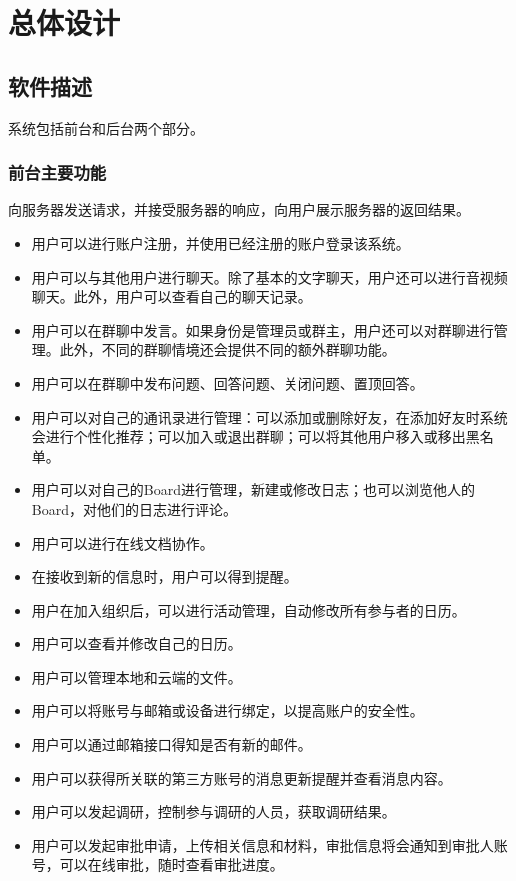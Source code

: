 \chapter{总体设计}
\section{\color{red}软件描述}
    系统包括前台和后台两个部分。
\subsection{\color{red}前台主要功能}
    向服务器发送请求，并接受服务器的响应，向用户展示服务器的返回结果。
    
    \begin{itemize}
        \item 用户可以进行账户注册，并使用已经注册的账户登录该系统。
        \item 用户可以与其他用户进行聊天。除了基本的文字聊天，用户还可以进行音视频聊天。此外，用户可以查看自己的聊天记录。
        \item 用户可以在群聊中发言。如果身份是管理员或群主，用户还可以对群聊进行管理。此外，不同的群聊情境还会提供不同的额外群聊功能。
        \item {\color{red} 用户可以在群聊中发布问题、回答问题、关闭问题、置顶回答。}
        \item 用户可以对自己的通讯录进行管理：可以添加或删除好友，在添加好友时系统会进行个性化推荐；可以加入或退出群聊；可以将其他用户移入或移出黑名单。
        \item 用户可以对自己的Board进行管理，新建或修改日志；也可以浏览他人的Board，对他们的日志进行评论。
        \item 用户可以进行在线文档协作。
        \item 在接收到新的信息时，用户可以得到提醒。
        \item 用户在加入组织后，可以进行活动管理，自动修改所有参与者的日历。
        \item 用户可以查看并修改自己的日历。  
        \item 用户可以管理本地和云端的文件。
        \item 用户可以将账号与邮箱或设备进行绑定，以提高账户的安全性。
        \item 用户可以通过邮箱接口得知是否有新的邮件。
        \item \color{red} {用户可以获得所关联的第三方账号的消息更新提醒并查看消息内容。}
        \item \color{red} {用户可以发起调研，控制参与调研的人员，获取调研结果。}
        \item \color{red} {用户可以发起审批申请，上传相关信息和材料，审批信息将会通知到审批人账号，可以在线审批，随时查看审批进度。}
    \end{itemize}
    
